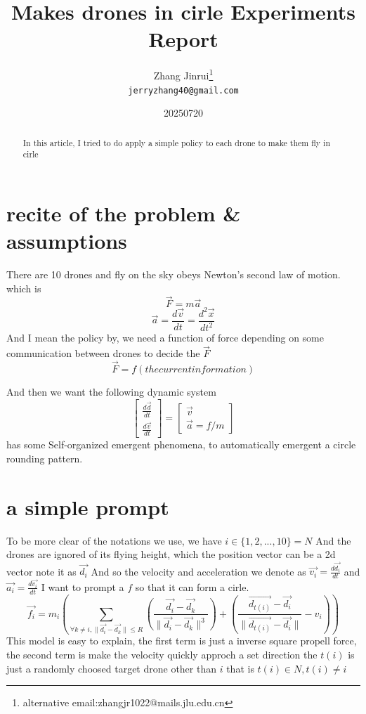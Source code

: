 \documentclass{article}
\title{Makes drones in cirle Experiments Report}
\author{Zhang Jinrui\thanks{alternative email:zhangjr1022@mails.jlu.edu.cn} \\ \texttt{jerryzhang40@gmail.com}}
\date{20250720}  %
\theoremstyle{definition} %
\begin{document}
\maketitle

\begin{abstract}
    In this article, I tried to do apply a
    simple policy to each drone to make
    them fly in cirle
\end{abstract}

\section{recite of the problem \& assumptions}
There are 10 drones and fly on the sky
obeys Newton's second law of motion.
which is
\[
    \vec{F} = m \vec{a}
\]
\[
    \vec{a} = \frac{d\vec{v}}{dt} = \frac{d^2 \vec{x}}{dt^2}
\]
And I mean the policy by, we need a function of force
depending on some communication between drones
to decide the \(\vec{F}\)
\[
    \vec{F}=f(the current information)
\]

And then we want the following dynamic system
\[\begin{bmatrix}
        \frac{d\vec{d}}{dt} \\
        \frac{d\vec{v}}{dt}
    \end{bmatrix}=
    \begin{bmatrix}
        \vec{v} \\
        \vec{a}=f/m
    \end{bmatrix}
\]
has some Self-organized emergent phenomena,
to automatically emergent a circle rounding pattern.

\section{a simple prompt}
To be more clear of the notations we use,
we have \(i\in\{1,2,...,10\}=N\)
And the drones are ignored of its flying
height, which the position vector can be a
2d vector note it as \(\vec{d_i}\)
And so the velocity and acceleration we denote as
\(\vec{v_i}=\frac{d\vec{d_i}}{dt}\)
and
\(\vec{a_i}=\frac{d\vec{v_i}}{dt}\)
I want to prompt a \(f\) so that it can form
a cirle.
\[
    \vec{f_i}=m_i(\sum_{\forall k\neq i,\|\vec{d_i}-\vec{d_k}\|\leq R}(\frac{\vec{d_i}-\vec{d_k}}{\|\vec{d_i}-\vec{d_k}\|^3})+(\frac{\vec{d_{t(i)}}-\vec{d_i}}{\|\vec{d_{t(i)}}-\vec{d_i}\|}-v_i))
\]
This model is easy to explain, the first term is
just a inverse square propell force, the second
term is make the velocity quickly approch a set direction
the \(t(i)\) is just a randomly choosed target drone
other than \(i\) that is \(t(i)\in N, t(i)\neq i\)
\end{document}
